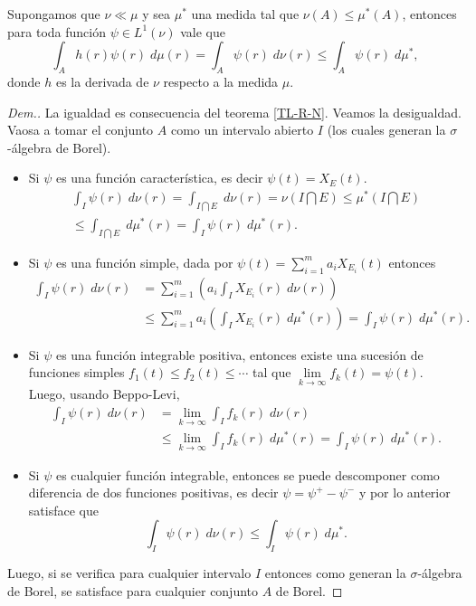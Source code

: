 \begin{lem}\label{obs3}
	Supongamos que  $\nu\ll\mu$ y sea $\mu^*$ una medida tal que $\nu(A)\leq \mu^*(A)$, entonces para toda función $\psi\in L^1(\nu)$ vale que 
	$$\int_A h(r)\psi(r)\;d\mu(r)=\int_A\psi(r)\;d\nu(r)\leq \int_A\psi(r)\;d\mu^*,$$
	donde $h$ es la derivada de $\nu$ respecto a la medida $\mu$.
\end{lem}
\begin{proof}[Dem.]
La igualdad es consecuencia del teorema \ref{TL-R-N}. Veamos la desigualdad. Vaosa a tomar el conjunto $A$ como un intervalo abierto $I$ (los cuales generan la $\sigma$-álgebra de Borel).
\begin{itemize}
	\item Si $\psi$ es una función característica, es decir $\psi(t)=X_E(t)$.
	\begin{multline*}
		\int_I \psi(r) \;d\nu(r)=\int_{I\bigcap E} \;d\nu(r)=\nu \left(I\bigcap E\right)\leq \mu^*\left(I\bigcap E\right)\\
		\leq\int_{I\bigcap E} \;d\mu^*(r)=\int_I\psi(r) \;d\mu^*(r).
	\end{multline*}
\item Si $\psi$ es una función simple, dada por $\psi(t)=\displaystyle\sum_{i=1}^{m}a_iX_{E_i}(t)$ entonces
\begin{equation*}
\begin{split}
	\int_I \psi(r)\; d\nu(r)&=\sum_{i=1}^{m}\left( a_i\int_IX_{E_i}(r) \;d\nu(r)\right) \\ &\leq
	\sum_{i=1}^{m}a_i\left( \int_IX_{E_i}(r) \;d\mu^*(r)\right) =\int_I \psi(r)\; d\mu^*(r).
 \end{split}
\end{equation*}
\item Si $\psi$ es una función integrable positiva, entonces existe una sucesión de funciones simples $f_1(t)\leq f_2(t)\leq\cdots$ tal que $\lim\limits_{k\to\infty}f_k(t)=\psi(t)$. Luego, usando Beppo-Levi,
\begin{equation*}
\begin{split}
	\int_I\psi(r)\;d\nu(r)&=\lim\limits_{k\to\infty}\int_I f_k(r)\;d\nu(r)\\
	&\leq \lim\limits_{k\to\infty}\int_I f_k(r)\;d\mu^*(r)=\int_I\psi(r)\;d\mu^*(r).
 \end{split}
\end{equation*}
	\item Si $\psi$ es cualquier función integrable, entonces se puede descomponer como diferencia de dos funciones positivas, es decir $\psi=\psi^+-\psi^-$  y por lo anterior satisface  que 
$$\int_I\psi(r)\;d\nu(r)\leq \int_I\psi(r)\;d\mu^*.$$	
\end{itemize}
Luego, si se verifica para cualquier intervalo $I$ entonces como generan la $\sigma$-álgebra de Borel, se satisface para cualquier conjunto $A$ de Borel.
\end{proof}








